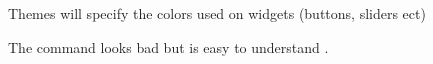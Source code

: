 Themes will specify the colors used on widgets (buttons, sliders ect)\par
 The command looks bad but is easy to understand .\par
 